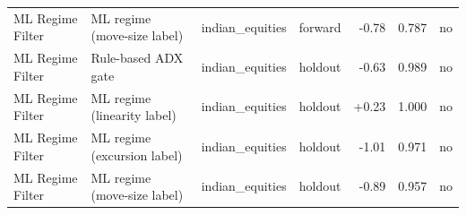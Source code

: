 \begin{longtable}{p{2.6cm} p{3.3cm} l l r r l}
ML Regime Filter & ML regime (move-size label) & indian\_equities & forward & -0.78 & 0.787 & no \\
ML Regime Filter & Rule-based ADX gate & indian\_equities & holdout & -0.63 & 0.989 & no \\
ML Regime Filter & ML regime (linearity label) & indian\_equities & holdout & +0.23 & 1.000 & no \\
ML Regime Filter & ML regime (excursion label) & indian\_equities & holdout & -1.01 & 0.971 & no \\
ML Regime Filter & ML regime (move-size label) & indian\_equities & holdout & -0.89 & 0.957 & no \\
\end{longtable}
